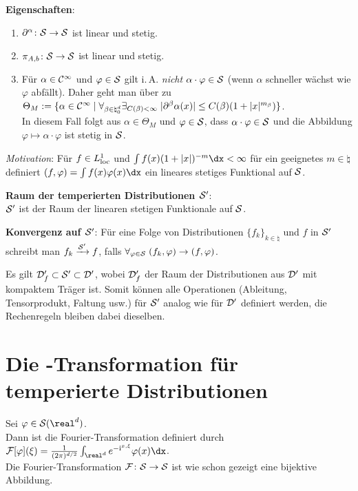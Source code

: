\textbf{Eigenschaften}:
\begin{enumerate}
    \item
    $\partial^\alpha\colon \S \rightarrow \S$ ist linear und stetig.

    \item
    $\pi_{A,b}\colon \S \rightarrow \S$ ist linear und stetig.

    \item
    Für $\alpha \in \C^\infty$ und $\varphi \in \S$ gilt i.\,A. \emph{nicht}
    $\alpha \cdot \varphi \in \S$
    (wenn $\alpha$ schneller wächst wie $\varphi$ abfällt).
    Daher geht man über zu $\Theta_M := \{\alpha \in \C^\infty \;|\;
    \forall_{\beta \in \natural_0^d} \exists_{C(\beta) < \infty}\;
    |\partial^\beta \alpha(x)| \le C(\beta) (1 + |x|^{m_\beta})\}$.\\
    In diesem Fall folgt aus $\alpha \in \Theta_M$ und $\varphi \in \S$,
    dass $\alpha \cdot \varphi \in \S$ und die Abbildung
    $\varphi \mapsto \alpha \cdot \varphi$ ist stetig in $\S$.
\end{enumerate}

\linie

\emph{Motivation}:
Für $f \in L^1_\loc$ und $\int f(x) (1 + |x|)^{-m} \dx < \infty$ für ein
geeignetes $m \in \natural$ definiert
$(f, \varphi) = \int f(x) \varphi(x)\dx$ ein lineares stetiges Funktional auf
$\S$.

\textbf{Raum der temperierten Distributionen $\S'$}:\\
$\S'$ ist der Raum der linearen stetigen Funktionale auf $\S$.

\textbf{Konvergenz auf $\S'$}:
Für eine Folge von Distributionen $\{f_k\}_{k \in \natural}$ und
$f$ in $\S'$ schreibt man $f_k \xrightarrow{\S'} f$, falls
$\forall_{\varphi \in \S}\; (f_k, \varphi) \to (f, \varphi)$.

Es gilt $\D_f' \subset \S' \subset \D'$, wobei
$\D_f'$ der Raum der Distributionen aus $\D'$ mit kompaktem Träger ist.
Somit können alle Operationen
(Ableitung, Tensorprodukt, Faltung usw.)
für $\S'$ analog wie für $\D'$ definiert werden,
die Rechenregeln bleiben dabei dieselben.

\pagebreak

\section{%
    Die -Transformation für temperierte Distributionen%
}

Sei $\varphi \in \S(\real^d)$.\\
Dann ist die Fourier-Transformation definiert durch
$\F[\varphi](\xi) = \frac{1}{(2\pi)^{d/2}}
\int_{\real^d} e^{-\i\sp{x, \xi}}\varphi(x)\dx$.\\
Die Fourier-Transformation $\F\colon \S \rightarrow \S$ ist wie schon gezeigt
eine bijektive Abbildung.

